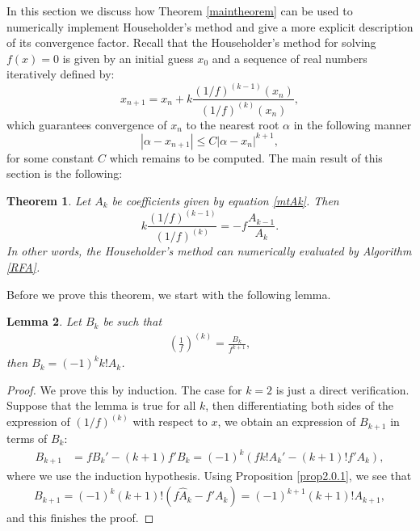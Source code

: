 \documentclass{article}
\newtheorem{theorem}{Theorem}%
\newtheorem{lemma}[theorem]{Lemma}
\begin{document}
In this section we discuss how Theorem \ref{maintheorem} can be used to numerically implement Householder's method and give a more explicit description of its convergence factor. Recall that the Householder's method for solving $f(x)=0$ is given by an initial guess $x_{0}$ and a sequence of real numbers iteratively defined by:
\[
x_{n+1}=x_{n}+k\frac{(1/f)^{(k-1)}(x_{n})}{(1/f)^{(k)}(x_{n})},
\]
which guarantees convergence of $x_{n}$ to the nearest root $\alpha$ in the following manner
\[
|\alpha-x_{n+1}|\leq C|\alpha-x_{n}|^{k+1},
\]
for some constant $C$ which remains to be computed. The main result of this section is the following:
\medskip
\begin{theorem}\label{Theorem-Householder}
	Let $A_{k}$ be coefficients given by equation \eqref{mtAk}.  Then
	\[
	k\frac{(1/f)^{(k-1)}}{(1/f)^{(k)}} = -f\frac{A_{k-1}}{A_{k}}.
	\]
	In other words, the Householder's method can numerically evaluated by Algorithm \ref{RFA}.
\end{theorem}
Before we prove this theorem, we start with the following lemma.
\medskip
\begin{lemma}\label{lem5}
	Let $B_{k}$ be such that 
	\begin{eqnarray}\label{lem5stat}
	\left(\frac{1}{f}\right)^{(k)} = \frac{B_{k}}{f^{k+1}},
	\end{eqnarray}
	then $B_{k}=(-1)^{k}k!A_{k}$.
\end{lemma}


\begin{proof}
	We prove this by induction. The case for $k=2$ is just a direct verification. Suppose that the lemma is true for all $k$, then differentiating both sides of the expression of $(1/f)^{(k)}$ with respect to $x$, we obtain an expression of $B_{k+1}$ in terms of $B_{k}$:
	\begin{align*}
		B_{k+1} &= fB_{k}'-(k+1)f'B_{k}
		= (-1)^{k}(fk!A_{k}'-(k+1)!f'A_{k}),
	\end{align*}
	where we use the induction hypothesis. Using Proposition \ref{prop2.0.1}, we see that 
	\begin{align*}
		B_{k+1} = (-1)^{k}(k+1)!(f\widehat{A}_{k}-f'A_{k})
		= (-1)^{k+1}(k+1)!A_{k+1},
	\end{align*}
	and this finishes the proof.
\end{proof}
\end{document}
